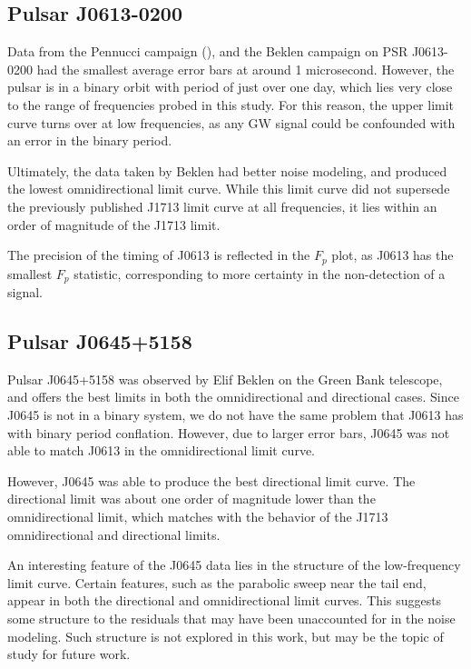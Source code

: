 \documentclass[12pt]{article}
\begin{document}
\subsection{Pulsar J0613-0200}

Data from the Pennucci campaign (\cite{Pennucci2015}), and the Beklen campaign on PSR J0613-0200 had the
smallest average error bars at around 1 microsecond. However, the pulsar is in a
binary orbit with period of just over one day, which lies very close to the
range of frequencies probed in this study. For this reason, the upper limit
curve turns over at low frequencies, as any GW signal could be confounded with
an error in the binary period.

Ultimately, the data taken by Beklen had better noise modeling, and produced the
lowest omnidirectional limit curve. While this limit curve did not supersede the
previously published J1713 limit curve at all frequencies, it lies within an
order of magnitude of the J1713 limit.

The precision of the timing of J0613 is reflected in the $F_p$ plot, as J0613
has the smallest $F_p$ statistic, corresponding to more certainty in the
non-detection of a signal.

\subsection{Pulsar J0645+5158}

Pulsar J0645+5158 was observed by Elif Beklen on the Green Bank telescope, and
offers the best limits in both the omnidirectional and directional cases. Since
J0645 is not in a binary system, we do not have the same problem that J0613 has
with binary period conflation. However, due to larger error bars, J0645 was not
able to match J0613 in the omnidirectional limit curve.

However, J0645 was able to produce the best directional limit curve. The
directional limit was about one order of magnitude lower than the
omnidirectional limit, which matches with the behavior of the J1713
omnidirectional and directional limits. 

An interesting feature of the J0645 data lies in the structure of the
low-frequency limit curve. Certain features, such as the parabolic sweep near
the tail end, appear in both the directional and omnidirectional limit curves.
This suggests some structure to the residuals that may have been unaccounted for
in the noise modeling. Such structure is not explored in this work, but may be
the topic of study for future work.
\end{document}
